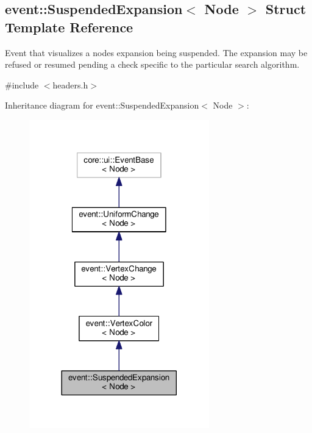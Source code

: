 \hypertarget{structevent_1_1SuspendedExpansion}{}\subsection{event\+:\+:Suspended\+Expansion$<$ Node $>$ Struct Template Reference}
\label{structevent_1_1SuspendedExpansion}


Event that visualizes a node\textquotesingle{}s expansion being suspended. The expansion may be refused or resumed pending a check specific to the particular search algorithm.  




{\ttfamily \#include $<$headers.\+h$>$}



Inheritance diagram for event\+:\+:Suspended\+Expansion$<$ Node $>$\+:\nopagebreak
\begin{figure}[H]
\begin{center}
\leavevmode
\includegraphics[width=221pt]{structevent_1_1SuspendedExpansion__inherit__graph}
\end{center}
\end{figure}


